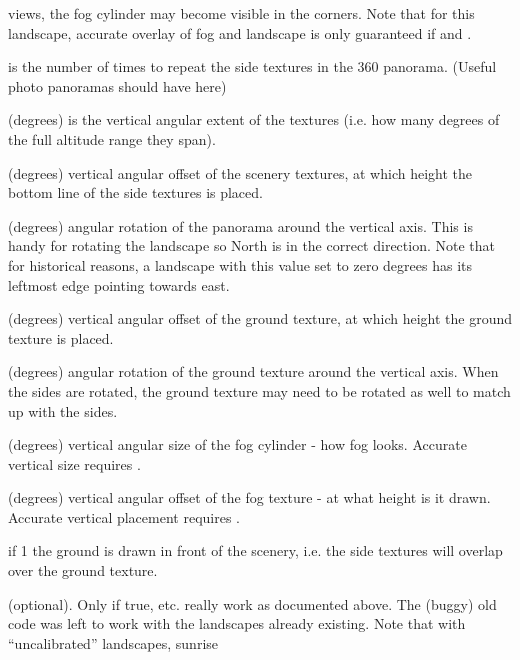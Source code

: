 \begin{description}
{  views, the fog cylinder may become visible in the corners.} Note that for this
  landscape, accurate overlay of fog and landscape is only guaranteed if
   and .
\item[\var{nb\_decor\_repeat}] is the number of times to repeat the
  side textures in the 360 panorama. (Useful photo panoramas should
  have  here)
\item[\var{decor\_alt\_angle}] (degrees) is the vertical angular
  extent of the textures (i.e. how many degrees of the full altitude
  range they span).
\item[\var{decor\_angle\_shift}] (degrees) vertical angular offset of
  the scenery textures, at which height the bottom line of the side
  textures is placed.
\item[\var{decor\_angle\_rotatez}] (degrees) angular rotation of the
  panorama around the vertical axis. This is handy for rotating the
  landscape so North is in the correct direction. Note that for
  historical reasons, a landscape with this value set to zero degrees
  has its leftmost edge pointing towards east.
\item[\var{ground\_angle\_shift}] (degrees) vertical angular offset of
  the ground texture, at which height the ground texture is placed.
\item[\var{ground\_angle\_rotatez}] (degrees) angular rotation of the
  ground texture around the vertical axis. When the sides are rotated,
  the ground texture may need to be rotated as well to match up with
  the sides.
\item[\var{fog\_alt\_angle}] (degrees) vertical angular size of the
  fog cylinder - how fog looks. Accurate vertical size requires
  .
\item[\var{fog\_angle\_shift}] (degrees) vertical angular offset of
  the fog texture - at what height is it drawn. Accurate vertical
  placement requires .
\item[\var{draw\_ground\_first}] if 1 the ground is drawn in front of
  the scenery, i.e. the side textures will overlap over the ground
  texture.
\item[\var{calibrated}] (optional). Only if true,
   etc. really work as documented above. The
  (buggy) old code was left to work with the landscapes already
  existing. Note that with ``uncalibrated'' landscapes, sunrise

\end{description}
